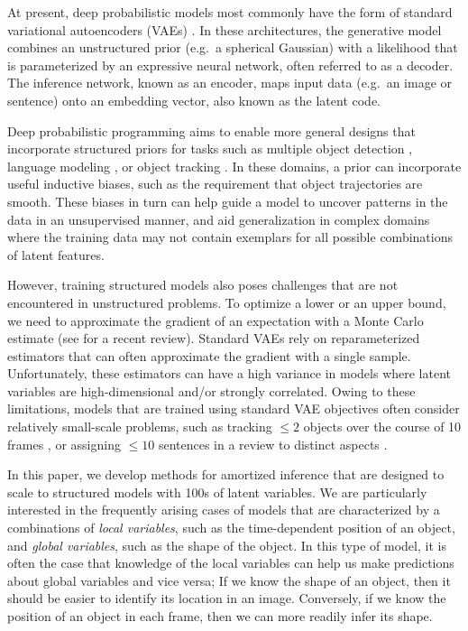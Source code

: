 \documentclass{article}
\theoremstyle{definition}
\begin{document}
At present, deep probabilistic models most commonly have the form of standard variational autoencoders (VAEs) \cite{kingma2013auto-encoding, rezende2014stochastic}. In these architectures, the  generative model combines an unstructured prior (e.g.~a spherical Gaussian) with a likelihood that is parameterized by an expressive neural network, often referred to as a decoder. The inference network, known as an encoder, maps input data (e.g.~an image or sentence) onto an embedding vector, also known as the latent code.

Deep probabilistic programming aims to enable more general designs that incorporate structured priors for tasks such as multiple object detection \cite{eslami2016attend}, language modeling \cite{esmaeili2019structured}, or object tracking \cite{kosiorek2018sequential}. In these domains, a prior can incorporate useful inductive biases, such as the requirement that object trajectories are smooth. These biases in turn can help guide a model to uncover patterns in the data in an unsupervised manner, and aid generalization in complex domains where the training data may not contain exemplars for all possible combinations of latent features.

However, training structured models also poses challenges that are not encountered in unstructured problems. To optimize a lower or an upper bound, we need to approximate the gradient of an expectation with a Monte Carlo estimate (see \cite{mohamed2019monte} for a recent review). Standard VAEs rely on reparameterized estimators that can often approximate the gradient with a single sample. Unfortunately, these estimators can have a high variance in models where latent variables are high-dimensional and/or strongly correlated. Owing to these limitations, models that are trained using standard VAE objectives often consider relatively small-scale problems, such as tracking $\le 2$ objects over the course of 10 frames \cite{kosiorek2018sequential}, or assigning $\le 10$ sentences in a review to distinct aspects \cite{esmaeili2019structured}. 

In this paper, we develop methods for amortized inference that are designed to scale to structured models with 100s of latent variables. We are particularly interested in the frequently arising cases of models that  are characterized by a combinations of \emph{local variables}, such as the time-dependent position of an object, and \emph{global variables}, such as the shape of the object. In this type of model, it is often the case that knowledge of the local variables can help us make predictions about global variables and vice versa; If we know the shape of an object, then it should be easier to identify its location in an image. Conversely, if we know the position of an object in each frame, then we can more readily infer its shape.
\end{document}
